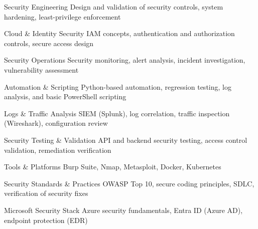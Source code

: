




\begin{cvskills}

  \cvskill
    {Security Engineering}
    {Design and validation of security controls, system hardening, least-privilege enforcement}

  \cvskill
    {Cloud \& Identity Security}
    {IAM concepts, authentication and authorization controls, secure access design}

  \cvskill
    {Security Operations}
    {Security monitoring, alert analysis, incident investigation, vulnerability assessment}

  \cvskill
    {Automation \& Scripting}
    {Python-based automation, regression testing, log analysis, and basic PowerShell scripting}

  \cvskill
    {Logs \& Traffic Analysis}
    {SIEM (Splunk), log correlation, traffic inspection (Wireshark), configuration review}

  \cvskill
    {Security Testing \& Validation}
    {API and backend security testing, access control validation, remediation verification}

  \cvskill
    {Tools \& Platforms}
    {Burp Suite, Nmap, Metasploit, Docker, Kubernetes}

  \cvskill
    {Security Standards \& Practices}
    {OWASP Top 10, secure coding principles, SDLC, verification of security fixes}

\cvskill
  {Microsoft Security Stack}
  {Azure security fundamentals, Entra ID (Azure AD), endpoint protection (EDR)}

\end{cvskills}

